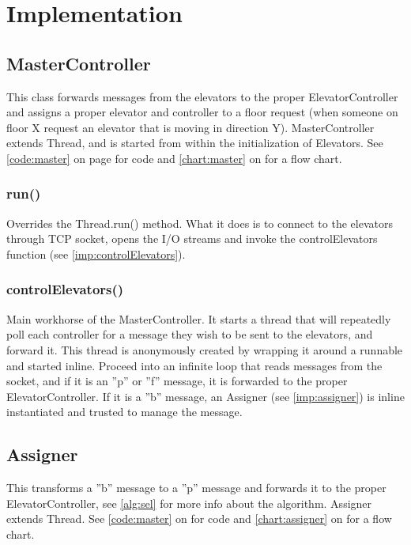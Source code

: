 \section{Implementation}
\subsection{MasterController}
This class forwards messages from the elevators to the proper ElevatorController and assigns a proper elevator and controller to a floor request (when someone on floor X request an elevator that is moving in direction Y). MasterController extends Thread, and is started from within the initialization of Elevators. See \cref{code:master} on page  for code and \cref{chart:master} on  for a flow chart.

\subsubsection{run()}
Overrides the Thread.run() method. What it does is to connect to the elevators through TCP socket, opens the I/O streams and invoke the controlElevators function (see \cref{imp:controlElevators}).

\subsubsection{controlElevators()}
Main workhorse of the MasterController. It starts a thread that will repeatedly poll each controller for a message they wish to be sent to the elevators, and forward it. This thread is anonymously created by wrapping it around a runnable and started inline. Proceed into an infinite loop that reads messages from the socket, and if it is an ''p'' or ''f'' message, it is forwarded to the proper ElevatorController. If it is a ''b'' message, an Assigner (see \cref{imp:assigner}) is inline instantiated and trusted to manage the message. 

\subsection{Assigner}
This transforms a ''b'' message to a ''p'' message and forwards it to the proper ElevatorController, see \cref{alg:sel} for more info about the algorithm.\newline
Assigner extends Thread. See \cref{code:master} on  for code and \cref{chart:assigner} on  for a flow chart.

